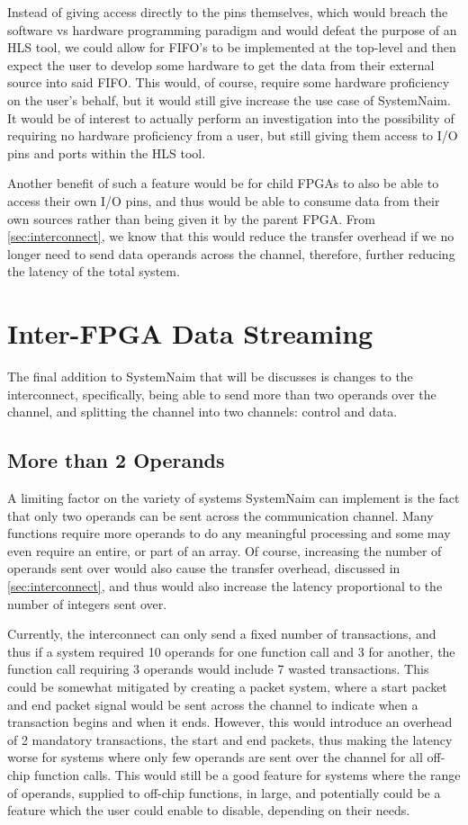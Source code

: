 Instead of giving access directly to the pins themselves, which would breach the software vs hardware programming paradigm and would defeat the purpose of an HLS tool, we could allow for FIFO's to be implemented at the top-level and then expect the user to develop some hardware to get the data from their external source into said FIFO. This would, of course, require some hardware proficiency on the user's behalf, but it would still give increase the use case of SystemNaim. It would be of interest to actually perform an investigation into the possibility of requiring no hardware proficiency from a user, but still giving them access to I/O pins and ports within the HLS tool.

Another benefit of such a feature would be for child FPGAs to also be able to access their own I/O pins, and thus would be able to consume data from their own sources rather than being given it by the parent FPGA. From \autoref{sec:interconnect}, we know that this would reduce the transfer overhead if we no longer need to send data operands across the channel, therefore, further reducing the latency of the total system.

\section{Inter-FPGA Data Streaming}

The final addition to SystemNaim that will be discusses is changes to the interconnect, specifically, being able to send more than two operands over the channel, and splitting the channel into two channels: control and data.

\subsection{More than 2 Operands}

A limiting factor on the variety of systems SystemNaim can implement is the fact that only two operands can be sent across the communication channel. Many functions require more operands to do any meaningful processing and some may even require an entire, or part of an array. Of course, increasing the number of operands sent over would also cause the transfer overhead, discussed in \autoref{sec:interconnect}, and thus would also increase the latency proportional to the number of integers sent over. 

Currently, the interconnect can only send a fixed number of transactions, and thus if a system required 10 operands for one function call and 3 for another, the function call requiring 3 operands would include 7 wasted transactions. This could be somewhat mitigated by creating a packet system, where a start packet and end packet signal would be sent across the channel to indicate when a transaction begins and when it ends. However, this would introduce an overhead of 2 mandatory transactions, the start and end packets, thus making the latency worse for systems where only few operands are sent over the channel for all off-chip function calls. This would still be a good feature for systems where the range of operands, supplied to off-chip functions, in large, and potentially could be a feature which the user could enable to disable, depending on their needs.

